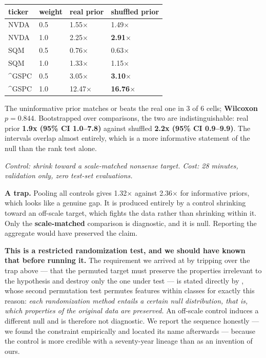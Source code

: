 {\def\LTcaptype{none} %
\begin{longtable}[]{@{}llll@{}}
\toprule\noalign{}
ticker & weight & real prior & shuffled prior \\
\midrule\noalign{}
\endhead
\bottomrule\noalign{}
\endlastfoot
NVDA & 0.5 & 1.55$\times$ & 1.49$\times$ \\
NVDA & 1.0 & 2.25$\times$ & \textbf{2.91$\times$} \\
SQM & 0.5 & 0.76$\times$ & 0.63$\times$ \\
SQM & 1.0 & 1.33$\times$ & 1.15$\times$ \\
\^{}GSPC & 0.5 & 3.05$\times$ & \textbf{3.10$\times$} \\
\^{}GSPC & 1.0 & 12.47$\times$ & \textbf{16.76$\times$} \\
\end{longtable}
}

The uninformative prior matches or beats the real one in 3 of 6 cells; \textbf{Wilcoxon \(p = 0.844\)}.
Bootstrapped over comparisons, the two are indistinguishable: real prior \textbf{1.9x (95\% CI
1.0--7.8)} against shuffled \textbf{2.2x (95\% CI 0.9--9.9)}. The intervals overlap almost entirely,
which is a more informative statement of the null than the rank test alone.

\emph{Control: shrink toward a scale-matched nonsense target. Cost: 28 minutes, validation only,
zero test-set evaluations.}

\textbf{A trap.} Pooling all controls gives 1.32$\times$ against 2.36$\times$ for informative priors, which looks
like a genuine gap. It is produced entirely by a control shrinking toward an off-scale target,
which fights the data rather than shrinking within it. Only the \textbf{scale-matched} comparison is
diagnostic, and it is null. Reporting the aggregate would have preserved the claim.

\textbf{This is a restricted randomization test, and we should have known that before running it.}
The requirement we arrived at by tripping over the trap above --- that the permuted target must
preserve the properties irrelevant to the hypothesis and destroy only the one under test --- is
stated directly by \citet{ojala2010permutation}, whose second permutation test permutes features
within classes for exactly this reason: \emph{each randomization method entails a certain null
distribution, that is, which properties of the original data are preserved.} An off-scale
control induces a different null and is therefore not diagnostic. We report the sequence
honestly --- we found the constraint empirically and located its name afterwards --- because the
control is more credible with a seventy-year lineage \citep{fisher1935design,pitman1937significance} than as an
invention of ours.
